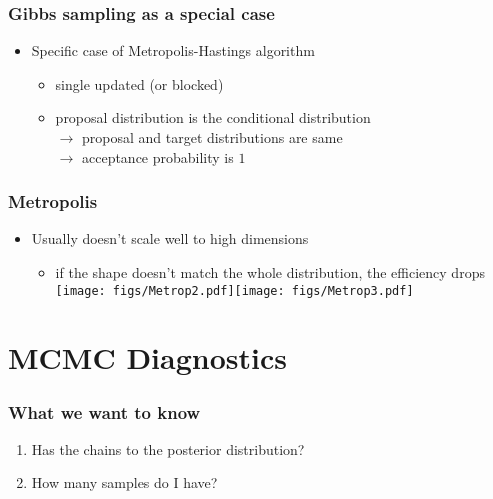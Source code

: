 \documentclass[10pt]{beamer}
\begin{document}
\begin{frame}

\frametitle{Gibbs sampling as a special case}

  \begin{itemize}
  \item Specific case of Metropolis-Hastings algorithm
    \begin{itemize}
    \item single updated (or blocked)
    \item proposal distribution is the conditional distribution\\
      $\rightarrow$ proposal and target distributions are same\\
      $\rightarrow$ acceptance probability is $1$
    \end{itemize}
  \end{itemize}

\end{frame}

\begin{frame}

\frametitle{ Metropolis}

  \begin{itemize}
  \item Usually doesn't scale well to high dimensions
    \begin{itemize}
    \item if the shape doesn't match the whole distribution, the efficiency drops
      \vspace{1\baselineskip}
      \hspace{-1cm}\texttt{[image: figs/Metrop2.pdf]}\texttt{[image: figs/Metrop3.pdf]}
    \end{itemize}
  \end{itemize}

\end{frame}

\section{MCMC Diagnostics}
\frame{\sectionpage}

\begin{frame}

\frametitle{What we want to know}

  \begin{enumerate}
  \item Has the chains  to the posterior distribution?
  \pause
  \item How many  samples do I have?
  \end{enumerate}

\end{frame}
\end{document}
